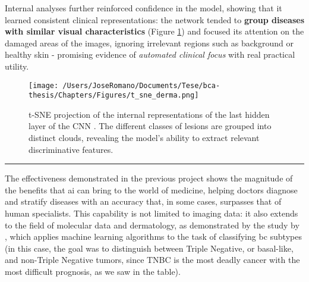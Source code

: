 Internal analyses further reinforced confidence in the model, showing that it
learned consistent clinical representations: the network tended to
\textbf{group diseases with similar visual characteristics} (Figure
\ref{fig:tsne_derma}) and focused its attention on the damaged areas of the
images, ignoring irrelevant regions such as background or healthy skin -
promising evidence of \textit{automated clinical focus} with real practical
utility.

\begin{figure} [h]
  \centering
  \texttt{[image: /Users/JoseRomano/Documents/Tese/bca-thesis/Chapters/Figures/t\_sne\_derma.png]}
  \caption{t-SNE projection of the internal representations of the last hidden layer of the CNN \cite{ai_in_dermacancer_esteva2017}. The different classes of lesions are grouped into distinct clouds, revealing the model's ability to extract relevant discriminative features.}
  \label{fig:tsne_derma}
\end{figure}

\noindent\rule{\linewidth}{0.4pt}

The effectiveness demonstrated in the previous project shows the magnitude of
the benefits that \gls{ai} can bring to the world of medicine, helping doctors
diagnose and stratify diseases with an accuracy that, in some cases, surpasses
that of human specialists. This capability is not limited to imaging data: it
also extends to the field of molecular data and dermatology, as demonstrated by
the study by \textcite{bca_subtypes_with_ml_Wu_2021}, which applies machine
learning algorithms to the task of classifying \gls{bc} subtypes (in this case,
the goal was to distinguish between Triple Negative, or basal-like, and
non-Triple Negative tumors, since TNBC is the most deadly cancer with the most
difficult prognosis, as we saw in the table).

